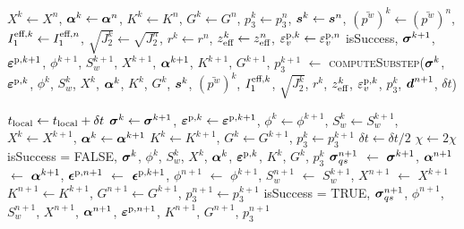 \begin{breakablealgorithm}
\begin{algorithmic}[1]
             $X^k \leftarrow X^n$, $\boldsymbol{\alpha}^k \leftarrow \boldsymbol{\alpha}^n$,
             $K^k \leftarrow K^n$, $G^k \leftarrow G^n$, 
             $p_3^k \leftarrow p_3^n$, \WRP
             $\boldsymbol{s}^k \leftarrow \boldsymbol{s}^n$, $(\bar{p^w})^k \leftarrow (\bar{p^w})^n$, 
             $I_1^{\text{eff},k} \leftarrow I_1^{\text{eff},n}$, 
             $\sqrt{J_2^k} \leftarrow \sqrt{J_2^n}$, $r^k \leftarrow r^n$, 
             $z_{\text{eff}}^k \leftarrow z_{\text{eff}}^n$, $\varepsilon_v^{\text{p},k} \leftarrow \varepsilon_v^{\text{p},n}$
      \Repeat
        \State isSuccess, $\boldsymbol{\sigma}^{k+1}$, $\boldsymbol{\varepsilon}^{\text{p},{k+1}}$, $\phi^{k+1}$, $S_w^{k+1}$, $X^{k+1}$, 
          $\boldsymbol{\alpha}^{k+1}$, $K^{k+1}$, $G^{k+1}$, $p_3^{k+1}$ $\leftarrow$ \WRP
          \textsc{computeSubstep}($\boldsymbol{\sigma}^k$, $\boldsymbol{\varepsilon}^{\text{p},k}$, $\phi^k$, $S_w^k$, 
                                  $X^k$, $\boldsymbol{\alpha}^k$, $K^k$, $G^k$,
                                  $\boldsymbol{s}^k$, $(\bar{p^w})^k$, $I_1^{\text{eff},k}$,  
                                  $\sqrt{J_2^k}$, $r^k$, $z_{\text{eff}}^k$, \WRP 
                                  $\varepsilon_v^{\text{p},k}$,
                                  $p_3^k$, $\boldsymbol{d}^{n+1}$, $\delta t$) \WRP
        
           \State $t_{\text{local}} \leftarrow t_{\text{local}} + \delta t$
           \State $\boldsymbol{\sigma}^k \leftarrow \boldsymbol{\sigma}^{k+1}$, $\boldsymbol{\varepsilon}^{\text{p},k} \leftarrow \boldsymbol{\varepsilon}^{\text{p},{k+1}}$,
                  $\phi^k \leftarrow \phi^{k+1}$, $S_w^k \leftarrow S_w^{k+1}$,
                  $X^k \leftarrow X^{k+1}$, $\boldsymbol{\alpha}^k \leftarrow \boldsymbol{\alpha}^{k+1}$ 
           \State $K^k \leftarrow K^{k+1}$, $G^k \leftarrow G^{k+1}$, $p_3^k \leftarrow p_3^{k+1}$
        \Else
           \State $\delta t \leftarrow \delta t/2$
           \State $\chi \leftarrow 2\chi$
           \If {$\chi > \chi_\Tmax$}
             \State \Return isSuccess = FALSE, $\boldsymbol{\sigma}^k$, $\phi^k$, $S_w^k$, $X^k$, $\boldsymbol{\alpha}^k$,
                                            $\boldsymbol{\varepsilon}^{\text{p},k}$, $K^k$, $G^k$, $p_3^k$ \WWRP 
           \EndIf
        \EndIf
      \State $\boldsymbol{\sigma}_{qs}^{n+1}$ $\leftarrow$ $\boldsymbol{\sigma}^{k+1}$,  
             $\boldsymbol{\alpha}^{n+1}$ $\leftarrow$ $\boldsymbol{\alpha}^{k+1}$,
             $\boldsymbol{\epsilon}^{\text{p},n+1}$ $\leftarrow$ $\boldsymbol{\epsilon}^{\text{p},{k+1}}$, 
             $\phi^{n+1}$ $\leftarrow$ $\phi^{{k+1}}$, 
             $S_w^{n+1}$ $\leftarrow$ $S_w^{{k+1}}$, 
             $X^{n+1}$ $\leftarrow$ $X^{{k+1}}$ 
      \State $K^{n+1} \leftarrow K^{k+1}$, $G^{n+1} \leftarrow G^{k+1}$, $p_3^{n+1} \leftarrow p_3^{k+1}$
      \State \Return isSuccess = TRUE, $\boldsymbol{\sigma}_{qs}^{n+1}$, $\phi^{n+1}$, $S_w^{n+1}$, $X^{n+1}$, 
        $\boldsymbol{\alpha}^{n+1}$, $\boldsymbol{\varepsilon}^{\text{p},n+1}$, $K^{n+1}$, $G^{n+1}$, $p_3^{n+1}$ \WRP
      
    \EndProcedure
  \end{algorithmic}
\end{breakablealgorithm}

